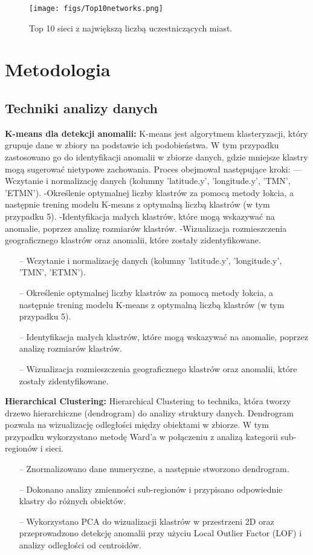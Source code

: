 \documentclass[a4paper,fleqn]{cas-dc}
\begin{document}
\begin{figure}[!htb]
    \centering
    \texttt{[image: figs/Top10networks.png]}
    \caption{Top 10 sieci z największą liczbą uczestniczących miast.}
    \label{FIG:top10networks}
\end{figure}




\section{Metodologia}
\subsection{Techniki analizy danych}
\textbf{K-means dla detekcji anomalii:} K-means jest algorytmem klasteryzacji, który grupuje dane w zbiory na podstawie ich podobieństwa. W tym przypadku zastosowano go do identyfikacji anomalii w zbiorze danych, gdzie mniejsze klastry mogą sugerować nietypowe zachowania. Proces obejmował następujące kroki:
---Wczytanie i normalizację danych (kolumny 'latitude.y', 'longitude.y', 'TMN', 'ETMN').
-Określenie optymalnej liczby klastrów za pomocą metody łokcia, a następnie trening modelu K-means z optymalną liczbą klastrów (w tym przypadku 5).
-Identyfikacja małych klastrów, które mogą wskazywać na anomalie, poprzez analizę rozmiarów klastrów.
-Wizualizacja rozmieszczenia geograficznego klastrów oraz anomalii, które zostały zidentyfikowane.


\begin{itemize}
\item[--] Wczytanie i normalizację danych (kolumny 'latitude.y', 'longitude.y', 'TMN', 'ETMN').
\item[--] Określenie optymalnej liczby klastrów za pomocą metody łokcia, a następnie trening modelu K-means z optymalną liczbą klastrów (w tym przypadku 5).
\item[--] Identyfikacja małych klastrów, które mogą wskazywać na anomalie, poprzez analizę rozmiarów klastrów.
\item[--] Wizualizacja rozmieszczenia geograficznego klastrów oraz anomalii, które zostały zidentyfikowane.
\end{itemize}


\textbf{Hierarchical Clustering:} Hierarchical Clustering to technika, która tworzy drzewo hierarchiczne (dendrogram) do analizy struktury danych. Dendrogram pozwala na wizualizację odległości między obiektami w zbiorze. W tym przypadku wykorzystano metodę Ward'a w połączeniu z analizą kategorii sub-regionów i sieci.
\begin{itemize}
\item[--] Znormalizowano dane numeryczne, a następnie stworzono dendrogram.
\item[--] Dokonano analizy zmienności sub-regionów i przypisano odpowiednie klastry do różnych obiektów.
\item[--] Wykorzystano PCA do wizualizacji klastrów w przestrzeni 2D oraz przeprowadzono detekcję anomalii przy użyciu Local Outlier Factor (LOF) i analizy odległości od centroidów.
\end{itemize}
\end{document}

